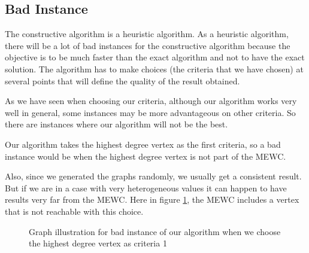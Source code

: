 
\subsection{Bad Instance}

The constructive algorithm is a heuristic algorithm. As a heuristic algorithm, there will be a
lot of bad instances for the constructive algorithm because the objective is to be much faster
than the exact algorithm and not to have the exact solution. The algorithm has to make
choices (the criteria that we have chosen) at several points that will define the quality of the result obtained.

As we have seen when choosing our criteria, although our algorithm works very well in general, some instances may be more advantageous on other criteria. So there are instances where our algorithm will not be the best. 
\bigskip

Our algorithm takes the highest degree vertex as the first criteria, so a bad instance would be when the highest degree vertex is not part of the MEWC. 
\bigskip

Also, since we generated the graphs randomly, we usually get a consistent result. But if we are in a case with very heterogeneous values it can happen to have results very far from the MEWC. Here in figure \ref{fig:bad-instance-vertex-highest-degree1}, the MEWC includes a vertex that is not reachable with this choice.

\begin{center}
    \begin{figure}[H]
        \centering
        \caption{Graph illustration for bad instance of our algorithm when we choose the highest degree vertex as criteria 1}
        \label{fig:bad-instance-vertex-highest-degree1}
    \end{figure}
\end{center}

